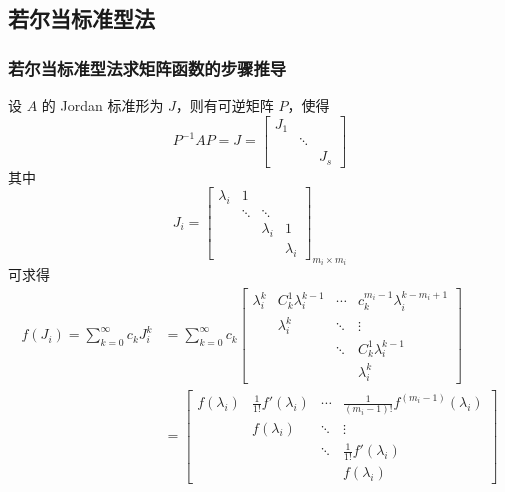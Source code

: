     \subsection{若尔当标准型法}
        \subsubsection{若尔当标准型法求矩阵函数的步骤推导}
            \par 设 $A$ 的 Jordan 标准形为 $J$，则有可逆矩阵 $P$，使得
            \begin{equation}
                P^{-1}AP = J = \begin{bmatrix}
                    J_1 & & \\ & \ddots & \\ & & J_s
                \end{bmatrix}
            \end{equation}
            其中
            \begin{equation*}
                J_i = \begin{bmatrix}
                    \lambda_i & 1 & & \\ & \ddots & \ddots & \\ & & \lambda_i & 1 \\ & & & \lambda_i
                \end{bmatrix}_{m_i \times m_i}
            \end{equation*}
            可求得
            \begin{align*}
                f(J_i) = \sum_{k=0}^{\infty}c_kJ_i^k &= \sum_{k=0}^{\infty}c_k \begin{bmatrix}
                    \lambda_i^k & C_k^1\lambda_i^{k-1} & \cdots & c_k^{m_i-1}\lambda_i^{k-m_i+1} \\ & \lambda_i^k & \ddots & \vdots \\ & & \ddots & C_k^1\lambda_i^{k-1} \\ & & & \lambda_i^k
                \end{bmatrix} \\ &= \begin{bmatrix}
                    f(\lambda_i) & \frac{1}{1!}f'(\lambda_i) & \cdots & \frac{1}{(m_i-1)!}f^{(m_i-1)}(\lambda_i) \\ & f(\lambda_i) & \ddots & \vdots \\ & & \ddots & \frac{1}{1!}f'(\lambda_i) \\ & & & f(\lambda_i)
                \end{bmatrix}
            \end{align*}
